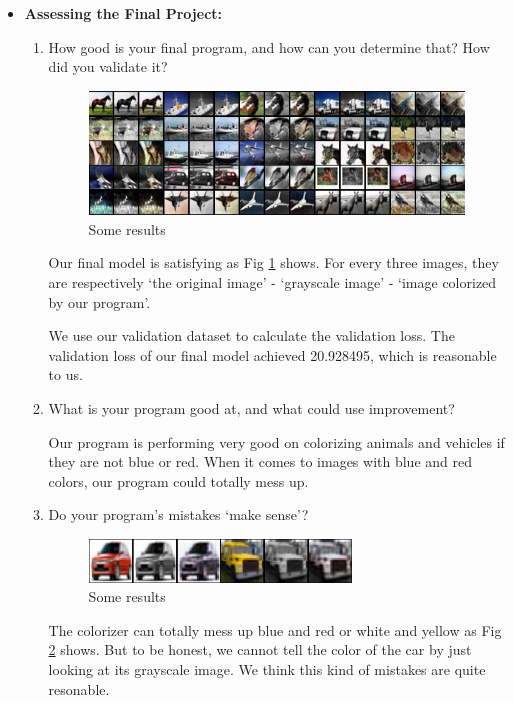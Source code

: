 \documentclass[letter]{article}
\begin{document}
\begin{itemize}
\begin{enumerate}
	\end{enumerate}
	\item {\textbf{Assessing the Final Project:}} 
	\begin{enumerate}
		\item {How good is your final program, and how can you determine that? How
			did you validate it?}
		\begin{figure}[H]
			\centering
			\includegraphics[width=\textwidth]{figs/fig-5.png}
			\caption{Some results}
			\label{fig-5}
		\end{figure}
		\par{Our final model is satisfying as Fig \ref{fig-5} shows. For every three images, they are respectively `the original image' - `grayscale image' - `image colorized by our program'.}
		\par{We use our validation dataset to calculate the validation loss. The validation loss of our final model achieved 20.928495, which is reasonable to us. }
		\item {What is your program good at, and what could use improvement?}
		\par{Our program is performing very good on colorizing animals and vehicles if they are not blue or red. When it comes to images with blue and red colors, our program could totally mess up.}
		\item {Do your program's mistakes `make sense'?}
		\begin{figure}[H]
			\centering
			\includegraphics[width=0.7\textwidth]{figs/fig-3.png}
			\caption{Some results}
			\label{fig-3}
		\end{figure}
		\par{The colorizer can totally mess up blue and red or white and yellow as Fig \ref{fig-3} shows. But to be honest, we cannot tell the color of the car by just looking at its grayscale image. We think this kind of mistakes are quite resonable.}

\end{enumerate}
\end{itemize}
\end{document}
